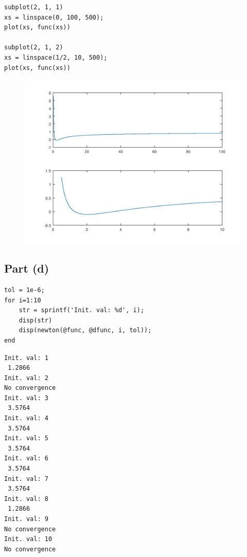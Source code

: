 \documentclass[10pt]{article}
\begin{document}
\begin{lstlisting}
subplot(2, 1, 1)
xs = linspace(0, 100, 500);
plot(xs, func(xs))

subplot(2, 1, 2)
xs = linspace(1/2, 10, 500);
plot(xs, func(xs))
\end{lstlisting}
\begin{figure}[!ht]
\includegraphics[width=\textwidth]{main-1.jpg}
\end{figure}


{}
\subsection*{Part (d)}

\begin{lstlisting}
tol = 1e-6;
for i=1:10
	str = sprintf('Init. val: %d', i);
	disp(str)
	disp(newton(@func, @dfunc, i, tol));
end
\end{lstlisting}
\begin{lstlisting}[language={},xleftmargin=5pt,frame=none]
Init. val: 1
 1.2866
Init. val: 2
No convergence
Init. val: 3
 3.5764
Init. val: 4
 3.5764
Init. val: 5
 3.5764
Init. val: 6
 3.5764
Init. val: 7
 3.5764
Init. val: 8
 1.2866
Init. val: 9
No convergence
Init. val: 10
No convergence

\end{lstlisting}
\end{document}
